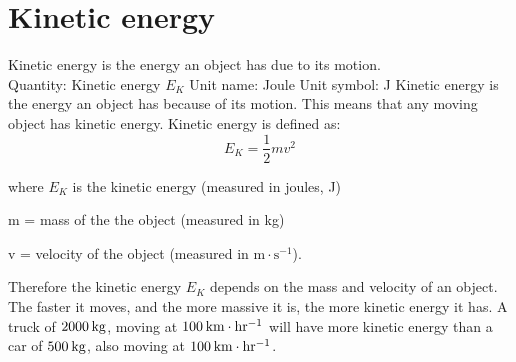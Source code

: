          \section{Kinetic energy}
    \nopagebreak
{} {Kinetic energy is the energy an object has due to its motion.\\
 Quantity: Kinetic energy {$E_{K}$} \hspace{1cm} Unit name: Joule \hspace{1cm} Unit symbol: J} 
      \label{m38785*id66796}Kinetic energy is the energy an object has because of its motion. This means that any moving object has kinetic energy. Kinetic energy is defined as:
    \begin{equation*}
    \boxed{{E}_{K}=\frac{1}{2}m{v}^{2}}
      \end{equation*}

where $E_{K}$ is the kinetic energy (measured in joules, J) \par
m = mass of the the object (measured in kg) \par
v = velocity of the object (measured in $\text{m} \cdot \text{s}^{-1}$). \par

Therefore the kinetic energy $E_{K}$ depends on the mass and velocity of an object. 
The faster it moves, and the more massive it is, the more kinetic energy it has. 
A truck of $2 000\phantom{\rule{2pt}{0ex}}\text{kg}$, moving at $100\phantom{\rule{2pt}{0ex}}\text{km}\ensuremath{\cdot}\text{hr}{}^{-1}$ will have more kinetic energy than a car of $500\phantom{\rule{2pt}{0ex}}\text{kg}$, also moving at $100\phantom{\rule{2pt}{0ex}}\text{km}\ensuremath{\cdot}\text{hr}{}^{-1}$. 
      \label{m38785*eip-368}
      \label{m38785*uid62}\nopagebreak\noindent{}

